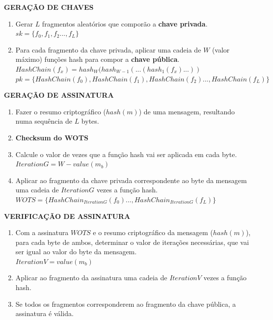 \documentclass[12pt, a4paper]{report}
\begin{document}
\begin{center}
	\textbf{GERAÇÃO DE CHAVES}
	\begin{enumerate}
		\item Gerar $L$ fragmentos aleatórios que comporão a \textbf{chave privada}.
			\\ $sk = \{f_0,f_1,f_2...,f_L\}$
		\item Para cada fragmento da chave privada, aplicar uma cadeia de $W$ (valor máximo) funções hash para compor a \textbf{chave pública}.
			\\ $HashChain(f_x) = hash_W(hash_{W-1}(...(hash_1(f_x)...))$
			\\ $pk = \{HashChain(f_0), HashChain(f_1), HashChain(f_2)..., HashChain(f_L)\}$
	\end{enumerate}
\end{center}
\begin{center}
	\textbf{GERAÇÃO DE ASSINATURA}
	\begin{enumerate}
		\item Fazer o resumo criptográfico ($hash(m)$) de uma mensagem, resultando numa sequência de $L$ bytes.
		\item \textbf{Checksum do WOTS}
		\item Calcule o valor de vezes que a função hash vai ser aplicada em cada byte.
			\\ $IterationG = W-value(m_b)$
		\item Aplicar ao fragmento da chave privada correspondente ao byte da mensagem uma cadeia de $IterationG$ vezes a função hash.
			\\$WOTS=\{HashChain_{IterationG}(f_0)...,HashChain_{IterationG}(f_L)\}$
	\end{enumerate}
\end{center}
\begin{center}
	\textbf{VERIFICAÇÃO DE ASSINATURA}
	\begin{enumerate}
		\item Com a assinatura $WOTS$ e o resumo criptográfico da mensagem ($hash(m)$), para cada byte de ambos, determinar o valor de iterações necessárias, que vai ser igual ao valor do byte da mensagem.
			\\ $IterationV = value(m_b)$
		\item Aplicar ao fragmento da assinatura uma cadeia de $IterationV$ vezes a função hash.
		\item Se todos os fragmentos corresponderem ao fragmento da chave pública, a assinatura é válida.
	\end{enumerate}
\end{center}
\end{document}
